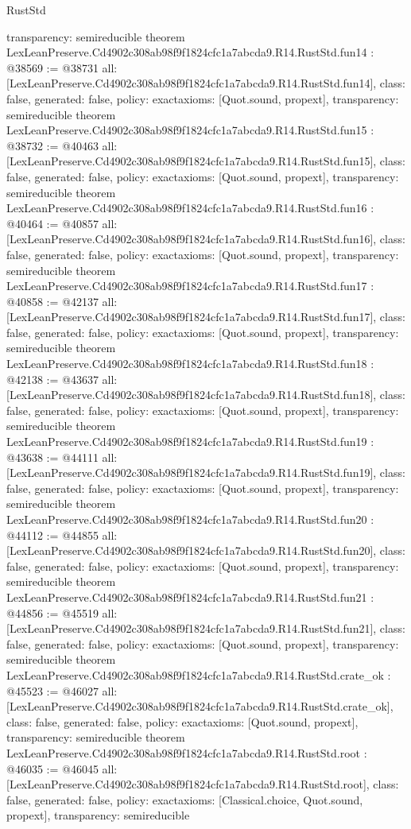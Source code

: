 \begin{lexlean}{RustStd}
\begin{coremodule}
{  transparency: semireducible
}
theorem LexLeanPreserve.Cd4902c308ab98f9f1824cfc1a7abcda9.R14.RustStd.fun14 : @38569 := @38731 {
  all: [LexLeanPreserve.Cd4902c308ab98f9f1824cfc1a7abcda9.R14.RustStd.fun14],
  class: false,
  generated: false,
  policy: exact{axioms: [Quot.sound, propext]},
  transparency: semireducible
}
theorem LexLeanPreserve.Cd4902c308ab98f9f1824cfc1a7abcda9.R14.RustStd.fun15 : @38732 := @40463 {
  all: [LexLeanPreserve.Cd4902c308ab98f9f1824cfc1a7abcda9.R14.RustStd.fun15],
  class: false,
  generated: false,
  policy: exact{axioms: [Quot.sound, propext]},
  transparency: semireducible
}
theorem LexLeanPreserve.Cd4902c308ab98f9f1824cfc1a7abcda9.R14.RustStd.fun16 : @40464 := @40857 {
  all: [LexLeanPreserve.Cd4902c308ab98f9f1824cfc1a7abcda9.R14.RustStd.fun16],
  class: false,
  generated: false,
  policy: exact{axioms: [Quot.sound, propext]},
  transparency: semireducible
}
theorem LexLeanPreserve.Cd4902c308ab98f9f1824cfc1a7abcda9.R14.RustStd.fun17 : @40858 := @42137 {
  all: [LexLeanPreserve.Cd4902c308ab98f9f1824cfc1a7abcda9.R14.RustStd.fun17],
  class: false,
  generated: false,
  policy: exact{axioms: [Quot.sound, propext]},
  transparency: semireducible
}
theorem LexLeanPreserve.Cd4902c308ab98f9f1824cfc1a7abcda9.R14.RustStd.fun18 : @42138 := @43637 {
  all: [LexLeanPreserve.Cd4902c308ab98f9f1824cfc1a7abcda9.R14.RustStd.fun18],
  class: false,
  generated: false,
  policy: exact{axioms: [Quot.sound, propext]},
  transparency: semireducible
}
theorem LexLeanPreserve.Cd4902c308ab98f9f1824cfc1a7abcda9.R14.RustStd.fun19 : @43638 := @44111 {
  all: [LexLeanPreserve.Cd4902c308ab98f9f1824cfc1a7abcda9.R14.RustStd.fun19],
  class: false,
  generated: false,
  policy: exact{axioms: [Quot.sound, propext]},
  transparency: semireducible
}
theorem LexLeanPreserve.Cd4902c308ab98f9f1824cfc1a7abcda9.R14.RustStd.fun20 : @44112 := @44855 {
  all: [LexLeanPreserve.Cd4902c308ab98f9f1824cfc1a7abcda9.R14.RustStd.fun20],
  class: false,
  generated: false,
  policy: exact{axioms: [Quot.sound, propext]},
  transparency: semireducible
}
theorem LexLeanPreserve.Cd4902c308ab98f9f1824cfc1a7abcda9.R14.RustStd.fun21 : @44856 := @45519 {
  all: [LexLeanPreserve.Cd4902c308ab98f9f1824cfc1a7abcda9.R14.RustStd.fun21],
  class: false,
  generated: false,
  policy: exact{axioms: [Quot.sound, propext]},
  transparency: semireducible
}
theorem LexLeanPreserve.Cd4902c308ab98f9f1824cfc1a7abcda9.R14.RustStd.crate_ok : @45523 := @46027 {
  all: [LexLeanPreserve.Cd4902c308ab98f9f1824cfc1a7abcda9.R14.RustStd.crate_ok],
  class: false,
  generated: false,
  policy: exact{axioms: [Quot.sound, propext]},
  transparency: semireducible
}
theorem LexLeanPreserve.Cd4902c308ab98f9f1824cfc1a7abcda9.R14.RustStd.root : @46035 := @46045 {
  all: [LexLeanPreserve.Cd4902c308ab98f9f1824cfc1a7abcda9.R14.RustStd.root],
  class: false,
  generated: false,
  policy: exact{axioms: [Classical.choice, Quot.sound, propext]},
  transparency: semireducible
}


\end{coremodule}
\end{lexlean}

